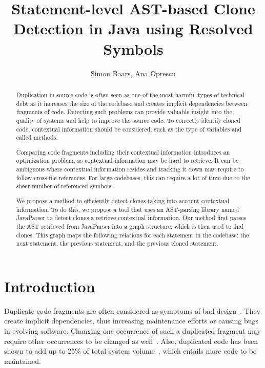 \documentclass[sigconf,authordraft]{article}
\begin{document}
\title{Statement-level AST-based Clone Detection in Java using Resolved Symbols}
\author{Simon Baars, Ana Oprescu}

\begin{abstract}
Duplication in source code is often seen as one of the most harmful types of technical debt as it increases the size of the codebase and creates implicit dependencies between fragments of code. Detecting such problems can provide valuable insight into the quality of systems and help to improve the source code. To correctly identify cloned code, contextual information should be considered, such as the type of variables and called methods.

Comparing code fragments including their contextual information introduces an optimization problem, as contextual information may be hard to retrieve. It can be ambiguous where contextual information resides and tracking it down may require to follow cross-file references. For large codebases, this can require a lot of time due to the sheer number of referenced symbols.

We propose a method to efficiently detect clones taking into account contextual information. To do this, we propose a tool that uses an AST-parsing library named JavaParser to detect clones a retrieve contextual information. Our method first parses the AST retrieved from JavaParser into a graph structure, which is then used to find clones. This graph maps the following relations for each statement in the codebase: the next statement, the previous statement, and the previous cloned statement.
\end{abstract}

\maketitle

\section{Introduction}
Duplicate code fragments are often considered as symptoms of bad design~\cite{fowler2018refactoring}. They create implicit dependencies, thus increasing maintenance efforts or causing bugs in evolving software. Changing one occurrence of such a duplicated fragment may require other occurrences to be changed as well~\cite{ostberg2014automatically}. Also, duplicated code has been shown to add up to 25\% of total system volume~\cite{bruntink2005use}, which entails more code to be maintained.
\end{document}
